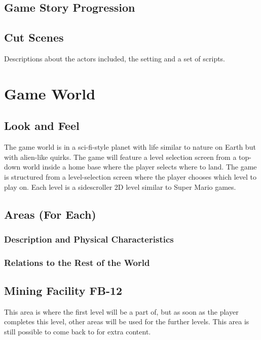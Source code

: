 \documentclass[12pt]{article}
\begin{document}
\subsection{Game Story Progression}

\subsection{Cut Scenes}

Descriptions about the actors included, the setting and a set of scripts.

\section{Game World}

\subsection{Look and Feel}

The game world is in a sci-fi-style planet with life similar to nature on Earth but with alien-like quirks. The game will feature a level selection screen from a top-down world inside a home base where the player selects where to land. The game is structured from a level-selection screen where the player chooses which level to play on. Each level is a sidescroller 2D level similar to Super Mario games. 

\subsection{Areas (For Each)}

\subsubsection{Description and Physical Characteristics}

\subsubsection{Relations to the Rest of the World}

\subsection{Mining Facility FB-12}

This area is where the first level will be a part of, but as soon as the player completes this level, other areas will be used for the further levels. This area is still possible to come back to for extra content. 
\end{document}
